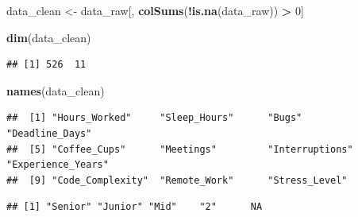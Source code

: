 \documentclass[
]{article}
\newenvironment{Shaded}{\begin{snugshade}}{\end{snugshade}}
\newcommand{\DecValTok}[1]{\textcolor[rgb]{0.00,0.00,0.81}{#1}}
\newcommand{\FunctionTok}[1]{\textcolor[rgb]{0.13,0.29,0.53}{\textbf{#1}}}
\newcommand{\NormalTok}[1]{#1}
\newcommand{\OtherTok}[1]{\textcolor[rgb]{0.56,0.35,0.01}{#1}}
\newcommand{\SpecialCharTok}[1]{\textcolor[rgb]{0.81,0.36,0.00}{\textbf{#1}}}
\begin{document}
\begin{Shaded}
\begin{Highlighting}[]
\NormalTok{data\_clean }\OtherTok{\textless{}{-}}\NormalTok{ data\_raw[, }\FunctionTok{colSums}\NormalTok{(}\SpecialCharTok{!}\FunctionTok{is.na}\NormalTok{(data\_raw)) }\SpecialCharTok{\textgreater{}} \DecValTok{0}\NormalTok{]}
\end{Highlighting}
\end{Shaded}

\begin{Shaded}
\begin{Highlighting}[]
\FunctionTok{dim}\NormalTok{(data\_clean)}
\end{Highlighting}
\end{Shaded}

\begin{verbatim}
## [1] 526  11
\end{verbatim}

\begin{Shaded}
\begin{Highlighting}[]
\FunctionTok{names}\NormalTok{(data\_clean)}
\end{Highlighting}
\end{Shaded}

\begin{verbatim}
##  [1] "Hours_Worked"     "Sleep_Hours"      "Bugs"             "Deadline_Days"   
##  [5] "Coffee_Cups"      "Meetings"         "Interruptions"    "Experience_Years"
##  [9] "Code_Complexity"  "Remote_Work"      "Stress_Level"
\end{verbatim}

\begin{Shaded}
\end{Shaded}

\begin{verbatim}
## [1] "Senior" "Junior" "Mid"    "2"      NA
\end{verbatim}

\begin{Shaded}
\end{Shaded}
\end{document}
